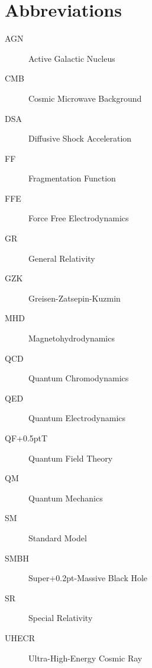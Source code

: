 \chapter*{Abbreviations}
\label{ch:abbreviations}

\begin{description}
	\item[AGN] Active Galactic Nucleus
	\item[CMB] Cosmic Microwave Background
	\item[DSA] Diffusive Shock Acceleration
	\item[FF] Fragmentation Function
	\item[FFE] Force Free Electrodynamics
	\item[GR] General Relativity
	\item[GZK] Greisen-Zatsepin-Kuzmin
	\item[MHD] Magnetohydrodynamics
	\item[QCD] Quantum Chromodynamics
	\item[QED] Quantum Electrodynamics
	\item[QF{\kern+0.5pt}T] Quantum Field Theory
	\item[QM] Quantum Mechanics
	\item[SM] Standard Model
	\item[SMBH] Super{\kern+0.2pt}-Massive Black Hole
	\item[SR] Special Relativity
	\item[UHECR] Ultra-High-Energy Cosmic Ray
\end{description}
